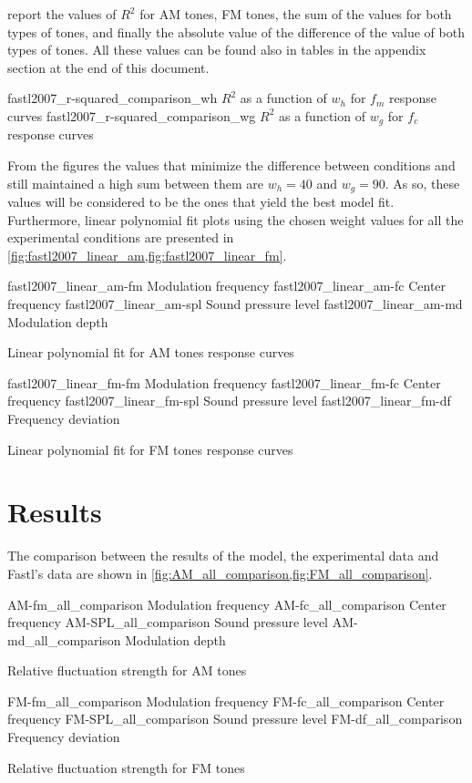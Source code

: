 \documentclass{article}
\begin{document}
report the values of $R^2$ for AM tones, FM tones, the sum of the values for
both types of tones, and finally the absolute value of the difference of the
value of both types of tones. All these values can be found also in tables in
the appendix section at the end of this document.

\myfigurepair%
  {fastl2007_r-squared_comparison_wh}
  {$R^2$ as a function of $w_h$ for $f_m$ response curves}
  {fastl2007_r-squared_comparison_wg}
  {$R^2$ as a function of $w_g$ for $f_c$ response curves}

From the figures the values that minimize the difference between conditions
and still maintained a high sum between them are $w_h = 40$ and $w_g = 90$. As
so, these values will be considered to be the ones that yield the best model
fit. Furthermore, linear polynomial fit plots using the chosen weight values for
all the experimental conditions are presented in
\cref{fig:fastl2007_linear_am,fig:fastl2007_linear_fm}.

\myfigurequad%
  {fastl2007_linear_am-fm}
  {Modulation frequency}
  {fastl2007_linear_am-fc}
  {Center frequency}
  {fastl2007_linear_am-spl}
  {Sound pressure level}
  {fastl2007_linear_am-md}
  {Modulation depth}
  {
    \caption{Linear polynomial fit for AM tones response curves}
    \label{fig:fastl2007_linear_am}
  }

\myfigurequad%
  {fastl2007_linear_fm-fm}
  {Modulation frequency}
  {fastl2007_linear_fm-fc}
  {Center frequency}
  {fastl2007_linear_fm-spl}
  {Sound pressure level}
  {fastl2007_linear_fm-df}
  {Frequency deviation}
  {
    \caption{Linear polynomial fit for FM tones response curves}
    \label{fig:fastl2007_linear_fm}
  }

\clearpage

\section{Results}
\label{sec:results}

The comparison between the results of the model, the experimental data and
Fastl's data are shown in \cref{fig:AM_all_comparison,fig:FM_all_comparison}.

\begin{comparison}

\myfigurequad%
  {AM-fm_all_comparison}
  {Modulation frequency}
  {AM-fc_all_comparison}
  {Center frequency}
  {AM-SPL_all_comparison}
  {Sound pressure level}
  {AM-md_all_comparison}
  {Modulation depth}
  {
    \caption{Relative fluctuation strength for AM tones}
    \label{fig:AM_all_comparison}
  }

\myfigurequad%
  {FM-fm_all_comparison}
  {Modulation frequency}
  {FM-fc_all_comparison}
  {Center frequency}
  {FM-SPL_all_comparison}
  {Sound pressure level}
  {FM-df_all_comparison}
  {Frequency deviation}
  {
    \caption{Relative fluctuation strength for FM tones}
    \label{fig:FM_all_comparison}
  }

\end{comparison}
\end{document}

